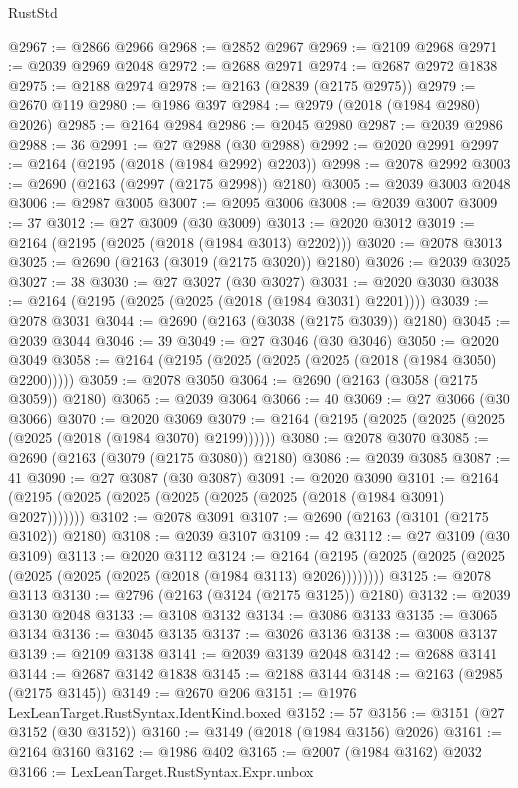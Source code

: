\begin{lexlean}{RustStd}
\begin{coremodule}
@2967 := @2866 @2966
@2968 := @2852 @2967
@2969 := @2109 @2968
@2971 := @2039 @2969 @2048
@2972 := @2688 @2971
@2974 := @2687 @2972 @1838
@2975 := @2188 @2974
@2978 := @2163 (@2839 (@2175 @2975))
@2979 := @2670 @119
@2980 := @1986 @397
@2984 := @2979 (@2018 (@1984 @2980) @2026)
@2985 := @2164 @2984
@2986 := @2045 @2980
@2987 := @2039 @2986
@2988 := 36
@2991 := @27 @2988 (@30 @2988)
@2992 := @2020 @2991
@2997 := @2164 (@2195 (@2018 (@1984 @2992) @2203))
@2998 := @2078 @2992
@3003 := @2690 (@2163 (@2997 (@2175 @2998)) @2180)
@3005 := @2039 @3003 @2048
@3006 := @2987 @3005
@3007 := @2095 @3006
@3008 := @2039 @3007
@3009 := 37
@3012 := @27 @3009 (@30 @3009)
@3013 := @2020 @3012
@3019 := @2164 (@2195 (@2025 (@2018 (@1984 @3013) @2202)))
@3020 := @2078 @3013
@3025 := @2690 (@2163 (@3019 (@2175 @3020)) @2180)
@3026 := @2039 @3025
@3027 := 38
@3030 := @27 @3027 (@30 @3027)
@3031 := @2020 @3030
@3038 := @2164 (@2195 (@2025 (@2025 (@2018 (@1984 @3031) @2201))))
@3039 := @2078 @3031
@3044 := @2690 (@2163 (@3038 (@2175 @3039)) @2180)
@3045 := @2039 @3044
@3046 := 39
@3049 := @27 @3046 (@30 @3046)
@3050 := @2020 @3049
@3058 := @2164 (@2195 (@2025 (@2025 (@2025 (@2018 (@1984 @3050) @2200)))))
@3059 := @2078 @3050
@3064 := @2690 (@2163 (@3058 (@2175 @3059)) @2180)
@3065 := @2039 @3064
@3066 := 40
@3069 := @27 @3066 (@30 @3066)
@3070 := @2020 @3069
@3079 := @2164 (@2195 (@2025 (@2025 (@2025 (@2025 (@2018 (@1984 @3070) @2199))))))
@3080 := @2078 @3070
@3085 := @2690 (@2163 (@3079 (@2175 @3080)) @2180)
@3086 := @2039 @3085
@3087 := 41
@3090 := @27 @3087 (@30 @3087)
@3091 := @2020 @3090
@3101 := @2164 (@2195 (@2025 (@2025 (@2025 (@2025 (@2025 (@2018 (@1984 @3091) @2027)))))))
@3102 := @2078 @3091
@3107 := @2690 (@2163 (@3101 (@2175 @3102)) @2180)
@3108 := @2039 @3107
@3109 := 42
@3112 := @27 @3109 (@30 @3109)
@3113 := @2020 @3112
@3124 := @2164 (@2195 (@2025 (@2025 (@2025 (@2025 (@2025 (@2025 (@2018 (@1984 @3113) @2026))))))))
@3125 := @2078 @3113
@3130 := @2796 (@2163 (@3124 (@2175 @3125)) @2180)
@3132 := @2039 @3130 @2048
@3133 := @3108 @3132
@3134 := @3086 @3133
@3135 := @3065 @3134
@3136 := @3045 @3135
@3137 := @3026 @3136
@3138 := @3008 @3137
@3139 := @2109 @3138
@3141 := @2039 @3139 @2048
@3142 := @2688 @3141
@3144 := @2687 @3142 @1838
@3145 := @2188 @3144
@3148 := @2163 (@2985 (@2175 @3145))
@3149 := @2670 @206
@3151 := @1976 LexLeanTarget.RustSyntax.IdentKind.boxed
@3152 := 57
@3156 := @3151 (@27 @3152 (@30 @3152))
@3160 := @3149 (@2018 (@1984 @3156) @2026)
@3161 := @2164 @3160
@3162 := @1986 @402
@3165 := @2007 (@1984 @3162) @2032
@3166 := LexLeanTarget.RustSyntax.Expr.unbox

\end{coremodule}
\end{lexlean}
